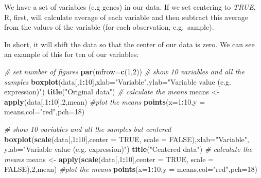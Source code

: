 \documentclass[
]{book}
\newenvironment{Shaded}{\begin{snugshade}}{\end{snugshade}}
\newcommand{\CommentTok}[1]{\textcolor[rgb]{0.56,0.35,0.01}{\textit{#1}}}
\newcommand{\DataTypeTok}[1]{\textcolor[rgb]{0.13,0.29,0.53}{#1}}
\newcommand{\DecValTok}[1]{\textcolor[rgb]{0.00,0.00,0.81}{#1}}
\newcommand{\KeywordTok}[1]{\textcolor[rgb]{0.13,0.29,0.53}{\textbf{#1}}}
\newcommand{\NormalTok}[1]{#1}
\newcommand{\OperatorTok}[1]{\textcolor[rgb]{0.81,0.36,0.00}{\textbf{#1}}}
\newcommand{\OtherTok}[1]{\textcolor[rgb]{0.56,0.35,0.01}{#1}}
\newcommand{\StringTok}[1]{\textcolor[rgb]{0.31,0.60,0.02}{#1}}
\theoremstyle{definition}
\theoremstyle{definition}
\theoremstyle{definition}
\theoremstyle{remark}
\begin{document}
We have a set of variables (e.g genes) in our data. If we set centering to \emph{TRUE}, R, first, will calculate average of each variable and then subtract this average from the values of the variable (for each observation, e.g.~sample).

In short, it will shift the data so that the center of our data is zero. We can see an example of this for ten of our variables:

\begin{Shaded}
\begin{Highlighting}[]
\CommentTok{# set number of figures}
\KeywordTok{par}\NormalTok{(}\DataTypeTok{mfrow=}\KeywordTok{c}\NormalTok{(}\DecValTok{1}\NormalTok{,}\DecValTok{2}\NormalTok{))}
\CommentTok{# show 10 variables and all the samples}
\KeywordTok{boxplot}\NormalTok{(data[,}\DecValTok{1}\OperatorTok{:}\DecValTok{10}\NormalTok{],}\DataTypeTok{xlab=}\StringTok{"Variable"}\NormalTok{,}\DataTypeTok{ylab=}\StringTok{"Variable value (e.g. expression)"}\NormalTok{)}
\KeywordTok{title}\NormalTok{(}\StringTok{"Original data"}\NormalTok{)}
\CommentTok{# calculate the means}
\NormalTok{means <-}\StringTok{ }\KeywordTok{apply}\NormalTok{(data[,}\DecValTok{1}\OperatorTok{:}\DecValTok{10}\NormalTok{],}\DecValTok{2}\NormalTok{,mean)}
\CommentTok{#plot the means}
\KeywordTok{points}\NormalTok{(}\DataTypeTok{x=}\DecValTok{1}\OperatorTok{:}\DecValTok{10}\NormalTok{,}\DataTypeTok{y =}\NormalTok{ means,}\DataTypeTok{col=}\StringTok{"red"}\NormalTok{,}\DataTypeTok{pch=}\DecValTok{18}\NormalTok{)}


\CommentTok{# show 10 variables and all the samples but centered}
\KeywordTok{boxplot}\NormalTok{(}\KeywordTok{scale}\NormalTok{(data[,}\DecValTok{1}\OperatorTok{:}\DecValTok{10}\NormalTok{],}\DataTypeTok{center =} \OtherTok{TRUE}\NormalTok{, }\DataTypeTok{scale =} \OtherTok{FALSE}\NormalTok{),}\DataTypeTok{xlab=}\StringTok{"Variable"}\NormalTok{,}
        \DataTypeTok{ylab=}\StringTok{"Variable value (e.g. expression)"}\NormalTok{)}
\KeywordTok{title}\NormalTok{(}\StringTok{"Centered data"}\NormalTok{)}
\CommentTok{# calculate the means}
\NormalTok{means <-}\StringTok{ }\KeywordTok{apply}\NormalTok{(}\KeywordTok{scale}\NormalTok{(data[,}\DecValTok{1}\OperatorTok{:}\DecValTok{10}\NormalTok{],}\DataTypeTok{center =} \OtherTok{TRUE}\NormalTok{, }\DataTypeTok{scale =} \OtherTok{FALSE}\NormalTok{),}\DecValTok{2}\NormalTok{,mean)}
\CommentTok{#plot the means}
\KeywordTok{points}\NormalTok{(}\DataTypeTok{x=}\DecValTok{1}\OperatorTok{:}\DecValTok{10}\NormalTok{,}\DataTypeTok{y =}\NormalTok{ means,}\DataTypeTok{col=}\StringTok{"red"}\NormalTok{,}\DataTypeTok{pch=}\DecValTok{18}\NormalTok{)}
\end{Highlighting}
\end{Shaded}
\end{document}

